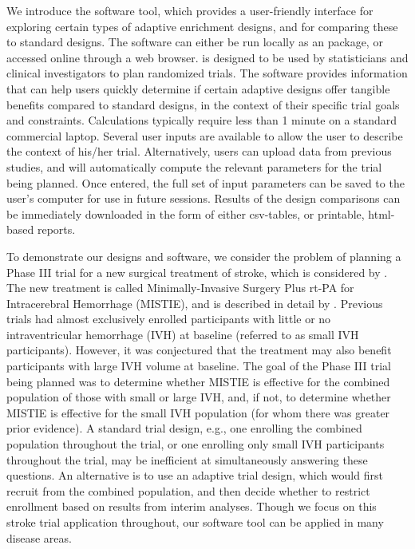 \documentclass[article]{jss}
\begin{document}
We introduce the  software tool, which provides a user-friendly interface for exploring certain types of adaptive enrichment designs, and for comparing these to standard designs.
The software can either be run locally as an  package, or accessed online through a web browser. 
 is designed to be used by statisticians and clinical investigators to plan randomized trials. The software provides information that can help users quickly determine if certain adaptive designs offer tangible benefits compared to standard designs, in the context of their specific trial goals and constraints. Calculations typically require less than 1 minute on a standard commercial laptop. Several user inputs are available to allow the user to describe the context of his/her trial. Alternatively, users can upload data from previous studies, and  will automatically compute the relevant parameters for the trial being planned. Once entered, the full set of input parameters can be saved to the user's computer for use in future sessions. Results of the design comparisons can be immediately downloaded in the form of either csv-tables, or printable, html-based reports.


To demonstrate our designs and software, we consider the problem of 
 planning a Phase III trial for a new surgical treatment of stroke, which is considered by \cite{Rosenblum2013AdaptMISTIE}.
The new treatment is  called Minimally-Invasive Surgery Plus rt-PA for Intracerebral Hemorrhage (MISTIE), and is described in detail by \cite{MISTIE_prelim2008}. 
Previous trials had almost exclusively enrolled participants with little or no intraventricular hemorrhage (IVH) at baseline (referred to as small IVH participants).
However, it was conjectured that the treatment may also benefit  participants with large IVH volume at baseline.  
The goal of the Phase III trial being planned was to determine whether MISTIE is effective for the combined population of those with small or large IVH, and, if not, to determine whether MISTIE is effective for the small IVH population (for whom there was greater prior evidence). A standard trial design, e.g., one enrolling the combined population throughout the trial, or one enrolling only small IVH participants throughout the trial, may be inefficient at simultaneously answering these questions.
An alternative is to use an adaptive trial design, which would first recruit from the combined population, and then decide whether to restrict enrollment based on results from interim  analyses. %
Though we focus on this stroke trial application throughout, our software tool can be applied in many disease areas.
\end{document}
